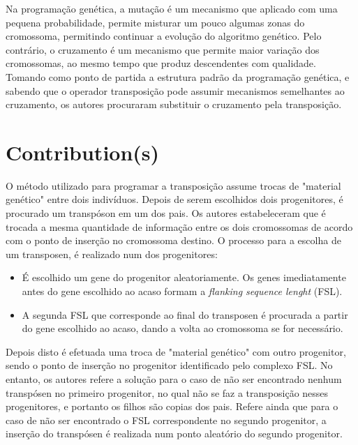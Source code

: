 \documentclass[12pt,portuguese,a4paper]{article}
\begin{document}
Na programação genética, a mutação é um mecanismo que aplicado com uma pequena probabilidade, permite misturar um pouco algumas zonas do cromossoma, permitindo continuar a evolução do algoritmo genético. Pelo contrário, o cruzamento é um mecanismo que permite maior variação dos cromossomas, ao mesmo tempo que produz descendentes com qualidade.  Tomando como ponto de partida a estrutura padrão da programação genética, e sabendo que o operador transposição pode assumir mecanismos semelhantes ao cruzamento, os autores procuraram substituir o cruzamento pela transposição.

\section{Contribution(s)}

O método utilizado para programar a transposição assume trocas de "material genético" entre dois indivíduos.
Depois de serem escolhidos dois progenitores, é procurado um transpóson em um dos pais.
Os autores estabeleceram que é trocada a mesma quantidade de informação entre os dois cromossomas de acordo com o ponto de inserção no cromossoma destino.
O processo para a escolha de um transposen, é realizado num dos progenitores:
\begin{itemize}
    \item É escolhido um gene do progenitor aleatoriamente. Os genes imediatamente antes do gene escolhido ao acaso formam a \textit{flanking sequence lenght} (FSL).
    \item A segunda FSL que corresponde ao final do transposen é procurada a partir do gene escolhido ao acaso, dando a volta ao cromossoma se for necessário.
\end{itemize}
Depois disto é efetuada uma troca de "material genético" com outro progenitor, sendo o ponto de inserção no progenitor identificado pelo complexo FSL.
No entanto, os autores refere a solução para o caso de não ser encontrado nenhum transpósen no primeiro progenitor, no qual não se faz a transposição nesses progenitores, e portanto os filhos são copias dos pais. Refere ainda que para o caso de não ser encontrado o FSL correspondente no segundo progenitor, a inserção do transpósen é realizada num ponto aleatório do segundo progenitor.
\end{document}

